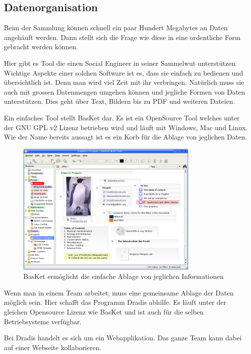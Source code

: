 \subsection{Datenorganisation}
Beim der Sammlung können schnell ein paar Hundert Megabytes an Daten angehäuft werden. Dann stellt sich die Frage wie diese in eine ordentliche Form gebracht werden können. 

Hier gibt es Tool die einen Social Engineer in seiner Sammelwut unterstützen. Wichtige Aspekte einer solchen Software ist es, dass sie einfach zu bedienen und übersichtlich ist. Denn man wird viel Zeit mit ihr verbringen. Natürlich muss sie auch mit grossen Datenmengen umgehen können und jegliche Formen von Daten unterstützen. Dies geht über Text, Bildern bis zu PDF und weiteren Dateien. 

Ein einfaches Tool stellt BasKet dar. Es ist ein OpenSource Tool welches unter der GNU GPL v2 Lizenz betrieben wird und läuft mit Windows, Mac und Linux. Wie der Name bereits aussagt ist es ein Korb für die Ablage von jeglichen Daten.

\begin{figure}[htb]
  \centering
  \includegraphics[width=0.8\textwidth]{images/basket.png}
  \caption[Test image for television]{BasKet ermöglicht die einfache Ablage von jeglichen Informationen}
  \label{fig:socialengineering:informationssammlung:datenorganisation:basket}
\end{figure}

Wenn man in einem Team arbeitet, muss eine gemeinsame Ablage der Daten möglich sein. Hier schafft das Programm Dradis abhilfe. Es läuft unter der gleichen Opensource Lizenz wie BasKet und ist auch für die selben Betriebsysteme verfügbar. 

Bei Dradis handelt es sich um ein Webapplikation. Das ganze Team kann dabei auf einer Webseite kollaborieren.

